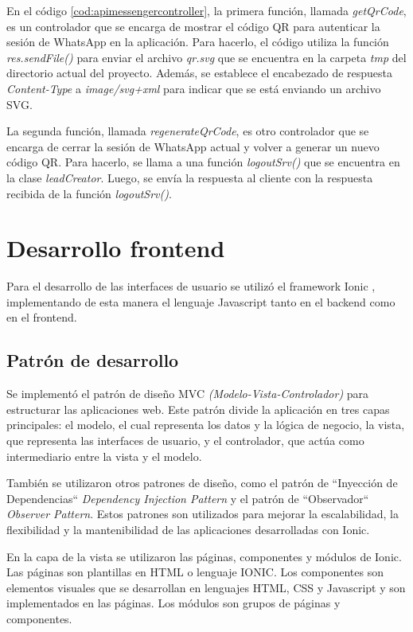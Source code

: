 En el código \ref{cod:apimessengercontroller}, la primera función, llamada \textit{getQrCode}, es un controlador que se encarga de mostrar el código QR para autenticar la sesión de WhatsApp en la aplicación. Para hacerlo, el código utiliza la función \textit{res.sendFile()} para enviar el archivo \textit{qr.svg} que se encuentra en la carpeta \textit{tmp} del directorio actual del proyecto. Además, se establece el encabezado de respuesta \textit{Content-Type} a \textit{image/svg+xml} para indicar que se está enviando un archivo SVG.

La segunda función, llamada \textit{regenerateQrCode}, es otro controlador que se encarga de cerrar la sesión de WhatsApp actual y volver a generar un nuevo código QR. Para hacerlo, se llama a una función \textit{logoutSrv()} que se encuentra en la clase \textit{leadCreator}. Luego, se envía la respuesta al cliente con la respuesta recibida de la función \textit{logoutSrv()}.


\section{Desarrollo frontend}
\label{sec:secarquitecturafrontend}
Para el desarrollo de las interfaces de usuario se utilizó el framework Ionic \cite{WEBSITE:ionic}, implementando de esta manera el lenguaje Javascript tanto en el backend como en el frontend.

\subsection{Patrón de desarrollo}
\label{subsec:frontpatron}

Se implementó el patrón de diseño MVC \citep{mvc} \textit{(Modelo-Vista-Controlador)} para estructurar las aplicaciones web. Este patrón divide la aplicación en tres capas principales: el modelo, el cual representa los datos y la lógica de negocio, la vista, que representa las interfaces de usuario, y el controlador, que actúa como intermediario entre la vista y el modelo.

También se utilizaron otros patrones de diseño, como el patrón de ``Inyección de Dependencias`` \citep{dependency-injection} \textit{Dependency Injection Pattern} y el patrón de ``Observador`` \citep{observer-pattern} \textit{Observer Pattern}. Estos patrones son utilizados para mejorar la escalabilidad, la flexibilidad y la mantenibilidad de las aplicaciones desarrolladas con Ionic.

En la capa de la vista se utilizaron las páginas, componentes y módulos de Ionic. Las páginas son plantillas en HTML o lenguaje IONIC. Los componentes son elementos visuales que se desarrollan en lenguajes HTML, CSS y Javascript y son implementados en las páginas. Los módulos son grupos de páginas y componentes. 


